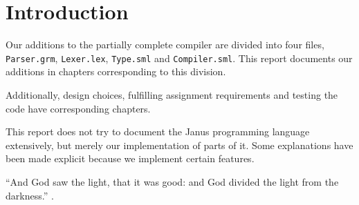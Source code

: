 \section{Introduction}
Our additions to the partially complete compiler are divided into four
files, {\tt Parser.grm}, {\tt Lexer.lex}, {\tt Type.sml} and {\tt Compiler.sml}.
This report documents our additions in chapters corresponding to this division.

Additionally, design choices, fulfilling assignment requirements and testing
the code have corresponding chapters.

This report does not try to document the Janus programming language extensively,
but merely our implementation of parts of it. Some explanations have been made
explicit because we implement certain features.

\vspace{1cm}
``And God saw the light, that it was good: and God divided the light from
the darkness.'' \cite[Gen. 1:4]{bible}.
